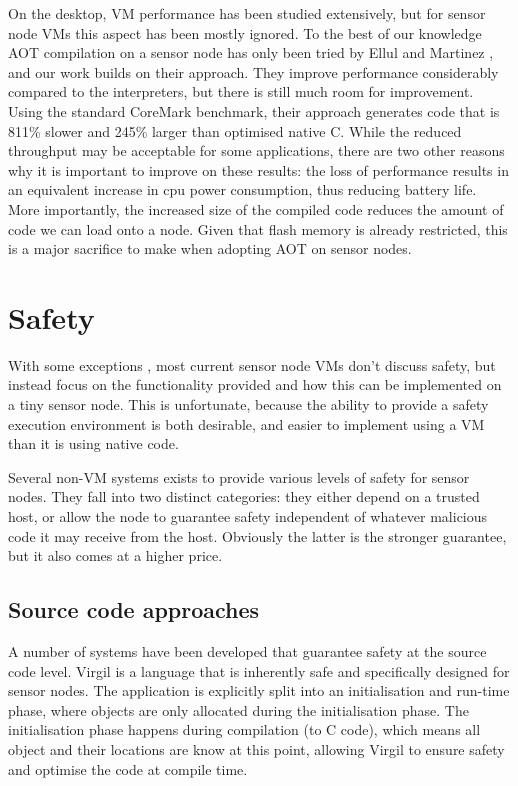 On the desktop, VM performance has been studied extensively, but for sensor node VMs this aspect has been mostly ignored. To the best of our knowledge AOT compilation on a sensor node has only been tried by Ellul and Martinez \cite{Ellul:2010iw}, and our work builds on their approach. They improve performance considerably compared to the interpreters, but there is still much room for improvement. Using the standard CoreMark benchmark, their approach generates code that is 811\% slower and 245\% larger than optimised native C. While the reduced throughput may be acceptable for some applications, there are two other reasons why it is important to improve on these results: the loss of performance results in an equivalent increase in cpu power consumption, thus reducing battery life. More importantly, the increased size of the compiled code reduces the amount of code we can load onto a node. Given that flash memory is already restricted, this is a major sacrifice to make when adopting AOT on sensor nodes.


\section{Safety}
\label{sec-state-of-the-art-safety}
With some exceptions \cite{Evers:2010ur}, most current sensor node VMs don't discuss safety, but instead focus on the functionality provided and how this can be implemented on a tiny sensor node. This is unfortunate, because the ability to provide a safety execution environment is both desirable, and easier to implement using a VM than it is using native code.

Several non-VM systems exists to provide various levels of safety for sensor nodes. They fall into two distinct categories: they either depend on a trusted host, or allow the node to guarantee safety independent of whatever malicious code it may receive from the host. Obviously the latter is the stronger guarantee, but it also comes at a higher price.

\subsection{Source code approaches}
A number of systems have been developed that guarantee safety at the source code level. Virgil \cite{Titzer:2006uy} is a language that is inherently safe and specifically designed for sensor nodes. The application is explicitly split into an initialisation and run-time phase, where objects are only allocated during the initialisation phase. The initialisation phase happens during compilation (to C code), which means all object and their locations are know at this point, allowing Virgil to ensure safety and optimise the code at compile time.

